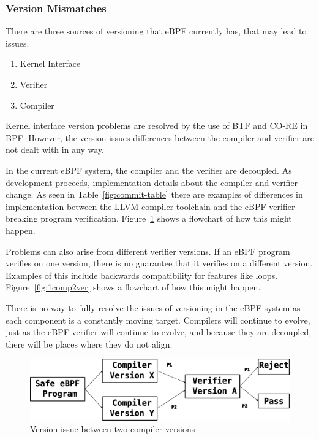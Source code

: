 {{{{{{{{\subsubsection{Version Mismatches}
There are three sources of versioning that eBPF currently has, that may lead to issues.
\begin{enumerate}
    \item Kernel Interface
    \item Verifier
    \item Compiler
\end{enumerate}

Kernel interface version problems are resolved by the use of BTF and CO-RE in BPF.
However, the version issues differences between the compiler and verifier are not dealt
    with in any way.

In the current eBPF system, the compiler and the verifier are decoupled.
As development proceeds, implementation details about the compiler and verifier change.
As seen in Table~\ref{fig:commit-table} there are examples of differences in implementation
    between the LLVM compiler toolchain and the eBPF verifier breaking 
    program verification.
Figure~\ref{fig:2comp1ver} shows a flowchart of how this might happen.

Problems can also arise from different verifier versions.
If an eBPF program verifies on one version, there is no guarantee that it verifies on a different version.
Examples of this include backwards compatibility for features like loops.
Figure~\ref{fig:1comp2ver} shows a flowchart of how this might happen.

There is no way to fully resolve the issues of versioning in the eBPF system as 
    each component is a constantly moving target.
Compilers will continue to evolve, just as the eBPF verifier will continue to evolve, and because they are decoupled, there will be places where they do not align.

\begin{figure}
    \includegraphics[width=1.0\linewidth]{figs/2comp1verifier}
    \centering
    \caption{Version issue between two compiler versions}
    \label{fig:2comp1ver}
\end{figure}

}}}}}}}}
